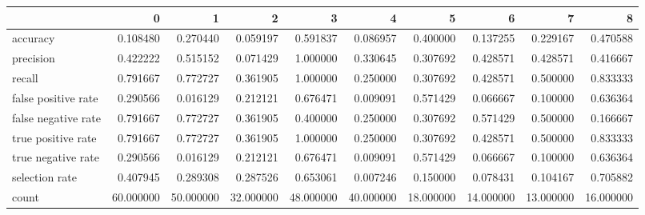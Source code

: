 \begin{tabular}{lrrrrrrrrr}
\toprule
{} &          0 &          1 &          2 &          3 &          4 &          5 &          6 &          7 &          8 \\
\midrule
accuracy            &   0.108480 &   0.270440 &   0.059197 &   0.591837 &   0.086957 &   0.400000 &   0.137255 &   0.229167 &   0.470588 \\
precision           &   0.422222 &   0.515152 &   0.071429 &   1.000000 &   0.330645 &   0.307692 &   0.428571 &   0.428571 &   0.416667 \\
recall              &   0.791667 &   0.772727 &   0.361905 &   1.000000 &   0.250000 &   0.307692 &   0.428571 &   0.500000 &   0.833333 \\
false positive rate &   0.290566 &   0.016129 &   0.212121 &   0.676471 &   0.009091 &   0.571429 &   0.066667 &   0.100000 &   0.636364 \\
false negative rate &   0.791667 &   0.772727 &   0.361905 &   0.400000 &   0.250000 &   0.307692 &   0.571429 &   0.500000 &   0.166667 \\
true positive rate  &   0.791667 &   0.772727 &   0.361905 &   1.000000 &   0.250000 &   0.307692 &   0.428571 &   0.500000 &   0.833333 \\
true negative rate  &   0.290566 &   0.016129 &   0.212121 &   0.676471 &   0.009091 &   0.571429 &   0.066667 &   0.100000 &   0.636364 \\
selection rate      &   0.407945 &   0.289308 &   0.287526 &   0.653061 &   0.007246 &   0.150000 &   0.078431 &   0.104167 &   0.705882 \\
count               &  60.000000 &  50.000000 &  32.000000 &  48.000000 &  40.000000 &  18.000000 &  14.000000 &  13.000000 &  16.000000 \\
\bottomrule
\end{tabular}
